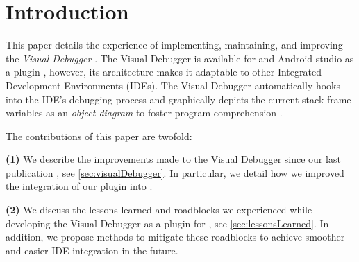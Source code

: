 \documentclass[sigconf]{acmart}
\begin{document}




\maketitle

\renewcommand\UrlFont{\color{blue}}

\section{Introduction}
This paper details the experience of implementing, maintaining, and improving the \textit{Visual Debugger} \cite{krauterVisualDebuggerTool2022}.
The Visual Debugger is available for \intellij{} and Android studio as a plugin \cite{timkrauterVisualDebuggerIntelliJ2023}, however, its architecture makes it adaptable to other Integrated Development Environments (IDEs).
The Visual Debugger automatically hooks into the IDE's debugging process and graphically depicts the current stack frame variables as an \textit{object diagram} to foster program comprehension \cite{krauterVisualDebuggerTool2022}.

The contributions of this paper are twofold:

\textbf{(1)} We describe the improvements made to the Visual Debugger since our last publication \cite{krauterVisualDebuggerTool2022}, see \autoref{sec:visualDebugger}.
In particular, we detail how we improved the integration of our plugin into \intellij{}.

\textbf{(2)} We discuss the lessons learned and roadblocks we experienced while developing the Visual Debugger as a plugin for \intellij{}, see \autoref{sec:lessonsLearned}.
In addition, we propose methods to mitigate these roadblocks to achieve smoother and easier IDE integration in the future. 
\end{document}
